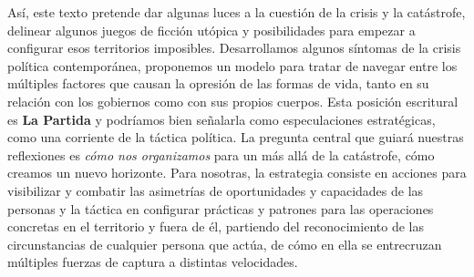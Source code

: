 Así, este texto pretende dar algunas luces a la cuestión de la crisis y la catástrofe, delinear algunos juegos de ficción utópica y posibilidades para empezar a configurar esos territorios imposibles. Desarrollamos algunos síntomas de la crisis política contemporánea, proponemos un modelo para tratar de navegar entre los múltiples factores que causan la opresión de las formas de vida, tanto en su relación con los gobiernos como con sus propios cuerpos. Esta posición escritural es \textbf{La Partida} y podríamos bien señalarla como especulaciones estratégicas, como una corriente de la táctica política. La pregunta central que guiará nuestras reflexiones es \emph{cómo nos organizamos} para un más allá de la catástrofe, cómo creamos un nuevo horizonte. Para nosotras, la estrategia consiste en acciones para visibilizar y combatir las asimetrías de oportunidades y capacidades de las personas y la táctica en configurar prácticas y patrones para las operaciones concretas en el territorio y fuera de él, partiendo del reconocimiento de las circunstancias de cualquier persona que actúa, de cómo en ella se entrecruzan múltiples fuerzas de captura a distintas velocidades.

